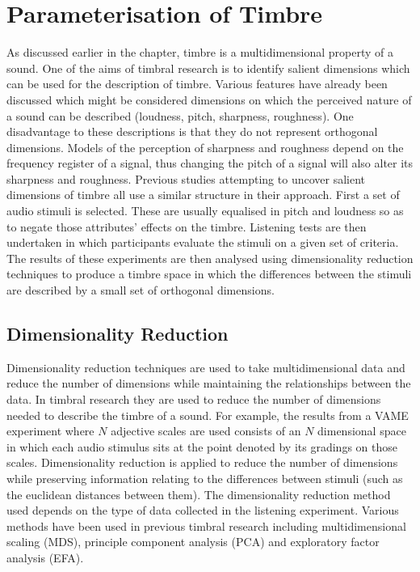 \section{Parameterisation of Timbre}
\label{sec:Timbre-Parameterisation}
	As discussed earlier in the chapter, timbre is a multidimensional property of a sound. One of the aims of timbral
	research is to identify salient dimensions which can be used for the description of timbre. Various features have
	already been discussed which might be considered dimensions on which the perceived nature of a sound can be
	described (loudness, pitch, sharpness, roughness). One disadvantage to these descriptions is that they do not
	represent orthogonal dimensions. Models of the perception of sharpness and roughness depend on the frequency
	register of a signal, thus changing the pitch of a signal will also alter its sharpness and roughness. Previous
	studies attempting to uncover salient dimensions of timbre all use a similar structure in their approach.  First a
	set of audio stimuli is selected. These are usually equalised in pitch and loudness so as to negate those
	attributes' effects on the timbre. Listening tests are then undertaken in which participants evaluate the stimuli
	on a given set of criteria. The results of these experiments are then analysed using dimensionality reduction
	techniques to produce a timbre space in which the differences between the stimuli are described by a small set of
	orthogonal dimensions.

	\subsection{Dimensionality Reduction}
	\label{sec:Timbre-Parameterisation-DimensionalityReduction}
		Dimensionality reduction techniques are used to take multidimensional data and reduce the number of
		dimensions while maintaining the relationships between the data. In timbral research they are used to
		reduce the number of dimensions needed to describe the timbre of a sound. For example, the results from a
		VAME experiment where $N$ adjective scales are used consists of an $N$ dimensional space in which each
		audio stimulus sits at the point denoted by its gradings on those scales. Dimensionality reduction is
		applied to reduce the number of dimensions while preserving information relating to the differences between
		stimuli (such as the euclidean distances between them). The dimensionality reduction method used depends on
		the type of data collected in the listening experiment. Various methods have been used in previous timbral
		research including multidimensional scaling (MDS), principle component analysis (PCA) and exploratory
		factor analysis (EFA).

